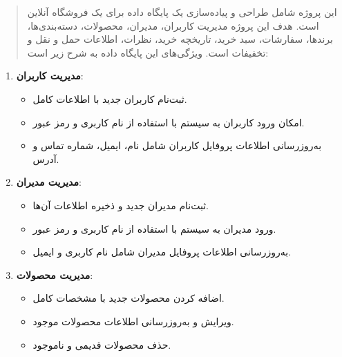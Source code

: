 \documentclass[12pt]{article}
\begin{document}
\fontsize{12pt}{14pt}\selectfont




\renewcommand{\abstractname}{طراحی پایگاه داده فروشگاه آنلاین}
\begin{abstract}
این پروژه شامل طراحی و پیاده‌سازی یک پایگاه داده برای یک فروشگاه آنلاین است. هدف این پروژه مدیریت کاربران، مدیران، محصولات، دسته‌بندی‌ها، برندها، سفارشات، سبد خرید، تاریخچه خرید، نظرات، اطلاعات حمل و نقل و تخفیفات است. ویژگی‌های این پایگاه داده به شرح زیر است:
\end{abstract}
\begin{enumerate}
    \item \textbf{مدیریت کاربران}:
    \begin{itemize}
        \item ثبت‌نام کاربران جدید با اطلاعات کامل.
        \item امکان ورود کاربران به سیستم با استفاده از نام کاربری و رمز عبور.
        \item به‌روزرسانی اطلاعات پروفایل کاربران شامل نام، ایمیل، شماره تماس و آدرس.
    \end{itemize}
    \vspace{0.3cm}
    
    \item \textbf{مدیریت مدیران}:
    \begin{itemize}
        \item ثبت‌نام مدیران جدید و ذخیره اطلاعات آن‌ها.
        \item ورود مدیران به سیستم با استفاده از نام کاربری و رمز عبور.
        \item به‌روزرسانی اطلاعات پروفایل مدیران شامل نام کاربری و ایمیل.
    \end{itemize}
    \vspace{0.3cm}

    \item \textbf{مدیریت محصولات}:
    \begin{itemize}
        \item اضافه کردن محصولات جدید با مشخصات کامل.
        \item ویرایش و به‌روزرسانی اطلاعات محصولات موجود.
        \item حذف محصولات قدیمی و ناموجود.
    \end{itemize}
    \vspace{0.3cm}
    

\end{enumerate}
\end{document}

